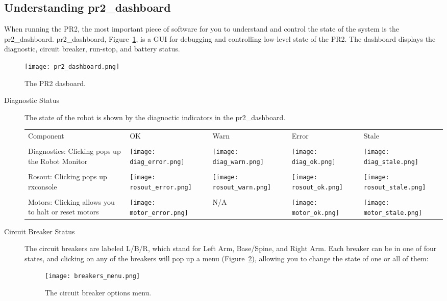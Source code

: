 \subsection{Understanding pr2\_dashboard}
When running the PR2, the most important piece of software for you to understand and control the state of the system is the pr2\_dashboard.
pr2\_dashboard, Figure~\ref{fig:dashboard}, is a GUI for debugging and controlling low-level state of the PR2. The dashboard displays the diagnostic, 
circuit breaker, run-stop, and battery status.
\begin{figure}[h]
\centering
\texttt{[image: pr2\_dashboard.png]}
\caption{The PR2 dasboard.}
\label{fig:dashboard}
\end{figure}
\begin{description}
\item[Diagnostic Status] The state of the robot is shown by the diagnoctic indicators in the pr2\_dashboard. \\

    \begin{tabular}{m{6cm}SSSS}
    Component & OK & Warn & Error & Stale\\
    &&&&\\
    Diagnostics: Clicking pops up the Robot Monitor & \texttt{[image: diag\_error.png]}&\texttt{[image: diag\_warn.png]}&
                                                      \texttt{[image: diag\_ok.png]}&\texttt{[image: diag\_stale.png]}\\
    &&&&\\
    Rosout: Clicking pops up rxconsole & \texttt{[image: rosout\_error.png]}&\texttt{[image: rosout\_warn.png]}&
                                        \texttt{[image: rosout\_ok.png]}&\texttt{[image: rosout\_stale.png]}\\
    &&&&\\
    Motors: Clicking allows you to halt or reset motors & \texttt{[image: motor\_error.png]}& N/A &
                                                          \texttt{[image: motor\_ok.png]}&\texttt{[image: motor\_stale.png]}\\
   \end{tabular}

\item[Circuit Breaker Status] The circuit breakers are labeled L/B/R, which stand for Left Arm, Base/Spine, and Right Arm. 
Each breaker can be in one of four states, and clicking on any of the breakers will pop up a menu (Figure~\ref{fig:breaker_menu}), allowing you to change the state of one or all of them:
\begin{figure}[h]
\centering
\texttt{[image: breakers\_menu.png]}
\caption{The circuit breaker options menu.}
\label{fig:breaker_menu}
\end{figure}


\end{description}
